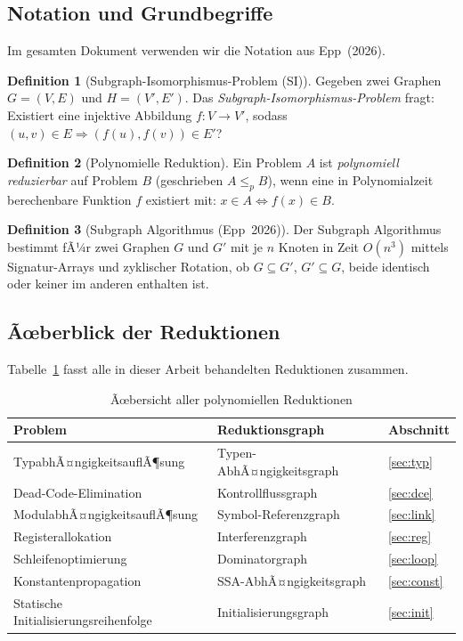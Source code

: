 ﻿\documentclass[a4paper,12pt]{article}
\theoremstyle{definition}
\newtheorem{definition}{Definition}
\begin{document}
\subsection{Notation und Grundbegriffe}

Im gesamten Dokument verwenden wir die Notation aus Epp~(2026).

\begin{definition}[Subgraph-Isomorphismus-Problem (SI)]
\label{def:si}
Gegeben zwei Graphen $G = (V, E)$ und $H = (V', E')$. Das \emph{Subgraph-Isomorphismus-Problem} fragt: Existiert eine injektive Abbildung $f: V \to V'$, sodass $(u, v) \in E \Rightarrow (f(u), f(v)) \in E'$?
\end{definition}

\begin{definition}[Polynomielle Reduktion]
Ein Problem $A$ ist \emph{polynomiell reduzierbar} auf Problem $B$ (geschrieben $A \leq_p B$), wenn eine in Polynomialzeit berechenbare Funktion $f$ existiert mit: $x \in A \Leftrightarrow f(x) \in B$.
\end{definition}

\begin{definition}[Subgraph Algorithmus (Epp~2026)]
\label{def:subgraph-algo}
Der Subgraph Algorithmus bestimmt fÃ¼r zwei Graphen $G$ und $G'$ mit je $n$ Knoten in Zeit $O(n^3)$ mittels Signatur-Arrays und zyklischer Rotation, ob $G \subseteq G'$, $G' \subseteq G$, beide identisch oder keiner im anderen enthalten ist.
\end{definition}

\subsection{Ãœberblick der Reduktionen}

Tabelle~\ref{tab:uebersicht} fasst alle in dieser Arbeit behandelten Reduktionen zusammen.

\begin{table}[h!]
\centering
\renewcommand{\arraystretch}{1.4}
\begin{tabular}{|l|l|l|}
\hline
\textbf{Problem} & \textbf{Reduktionsgraph} & \textbf{Abschnitt} \\
\hline
TypabhÃ¤ngigkeitsauflÃ¶sung & Typen-AbhÃ¤ngigkeitsgraph & \ref{sec:typ} \\
Dead-Code-Elimination & Kontrollflussgraph & \ref{sec:dce} \\
ModulabhÃ¤ngigkeitsauflÃ¶sung & Symbol-Referenzgraph & \ref{sec:link} \\
Registerallokation & Interferenzgraph & \ref{sec:reg} \\
Schleifenoptimierung & Dominatorgraph & \ref{sec:loop} \\
Konstantenpropagation & SSA-AbhÃ¤ngigkeitsgraph & \ref{sec:const} \\
Statische Initialisierungsreihenfolge & Initialisierungsgraph & \ref{sec:init} \\
\hline
\end{tabular}
\caption{Ãœbersicht aller polynomiellen Reduktionen}
\label{tab:uebersicht}
\end{table}
\end{document}
